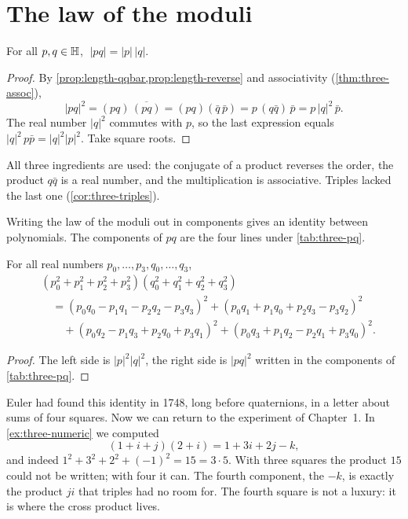 \section{The law of the moduli}

\begin{theorem}\label{thm:length-moduli}
For all $p,q\in\mathbb{H}$, $\;|pq|=|p|\,|q|$.
\end{theorem}

\begin{proof}
By \cref{prop:length-qqbar,prop:length-reverse} and associativity (\cref{thm:three-assoc}),
\[
  |pq|^2=(pq)\,\overline{(pq)}=(pq)(\bar q\,\bar p)=p\,(q\bar q)\,\bar p=p\,|q|^2\,\bar p .
\]
The real number $|q|^2$ commutes with $p$, so the last expression equals $|q|^2\,p\bar p=|q|^2|p|^2$. Take square roots.
\end{proof}

All three ingredients are used: the conjugate of a product reverses the order, the product $q\bar q$ is a real number, and the multiplication is associative. Triples lacked the last one (\cref{cor:three-triples}).

Writing the law of the moduli out in components gives an identity between polynomials. The components of $pq$ are the four lines under \cref{tab:three-pq}.

\begin{corollary}\label{cor:length-euler}
For all real numbers $p_0,\dots,p_3,q_0,\dots,q_3$,
\begin{align*}
  &(p_0^2+p_1^2+p_2^2+p_3^2)(q_0^2+q_1^2+q_2^2+q_3^2)\\
  &\quad=(p_0q_0-p_1q_1-p_2q_2-p_3q_3)^2+(p_0q_1+p_1q_0+p_2q_3-p_3q_2)^2\\
  &\qquad+(p_0q_2-p_1q_3+p_2q_0+p_3q_1)^2+(p_0q_3+p_1q_2-p_2q_1+p_3q_0)^2 .
\end{align*}
\end{corollary}

\begin{proof}
The left side is $|p|^2|q|^2$, the right side is $|pq|^2$ written in the components of \cref{tab:three-pq}.
\end{proof}

Euler had found this identity in 1748, long before quaternions, in a letter about sums of four squares. Now we can return to the experiment of Chapter~1. In \cref{ex:three-numeric} we computed
\[
  (1+i+j)(2+i)=1+3i+2j-k ,
\]
and indeed $1^2+3^2+2^2+(-1)^2=15=3\cdot5$. With three squares the product $15$ could not be written; with four it can. The fourth component, the $-k$, is exactly the product $ji$ that triples had no room for. The fourth square is not a luxury: it is where the cross product lives.

